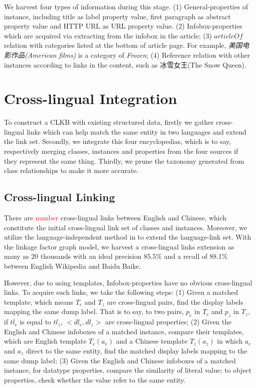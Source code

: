 \documentclass[runningheads,a4paper]{llncs}
\begin{document}
\begin{CJK*}{UTF8}{song}
We harvest four types of information during this stage. (1) General-properties of instance, including title as label property value, first paragraph as abstract property value and HTTP URL as URL property value. (2) Infobox-properties which are acquired via extracting from the infobox in the article; (3) $articleOf$ relation with categories listed at the bottom of article page. For example, \textit{美国电影作品(American films)} is a category of \textit{Frozen}; (4) Reference relation with other instances according to links in the content, such as 冰雪女王(The Snow Queen).

\section{Cross-lingual Integration}
\label{sec:clkbb}

To construct a CLKB with existing structured data, firstly we gather cross-lingual links which can help match the same entity in two languages and extend the link set. Secondly, we integrate this four encyclopedias, which is to say, respectively merging classes, instances and properties from the four sources if they represent the same thing. Thirdly, we prune the taxonomy generated from class relationships to make it more accurate.

\subsection{Cross-lingual Linking}
There are \textcolor{red}{number} cross-lingual links between English and Chinese, which constitute the initial cross-lingual link set of classes and instances. Moreover, we utilize the language-independent method in \cite{wang2012cross} to extend the language-link set. With the linkage factor graph model, we harvest a cross-lingual links extension as many as 20 thousands with an ideal precision 85.5\% and a recall of 88.1\% between English Wikipedia and Baidu Baike.

However, due to using templates, Infobox-properties have no obvious cross-lingual links. To acquire such links, we take the following steps: (1) Given a matched template, which means $T_{e}$ and $T_{z}$ are cross-lingual pairs, find the display labels mapping the same dump label. That is to say, to two pairs, $p_{e}$ in $T_{e}$ and $p_{z}$ in $T_{z}$, if $tl_{e}$ is equal to $tl_{z}$, $<dl_{e},dl_{z}>$ are cross-lingual properties; (2) Given the English and Chinese infoboxes of a matched instance, compare their templates, which are English template $T_{e}(a_{e})$ and a Chinese template $T_{z}(a_{z})$ in which $a_{e}$ and $a_{z}$ direct to the same entity, find the matched display labels mapping to the same dump label; (3) Given the English and Chinese infoboxes of a matched instance, for datatype properties, compare the similarity of literal value; to object properties, check whether the value refer to the same entity.


\end{CJK*}
\end{document}
